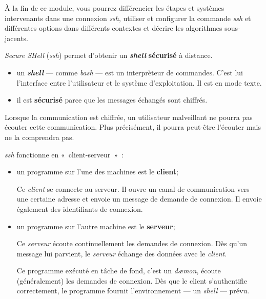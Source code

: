 \documentclass[a4paper,11pt]{article}
\date{2018 -- 2019}
\begin{document}
\entete
\titre
{}
\lastedit

\dosecttoc
\setcounter{tocdepth}{1} 


\begin{tcolorbox}
	[blanker, before skip=10mm,after skip=10mm, 
		borderline west={1mm}{-4mm}{lightgray},
		title=Objectifs, coltitle=black, fonttitle=\sffamily\bfseries\large]

		À la fin de ce module, vous pourrez différencier les étapes et systèmes
		intervenants dans une connexion \textit{ssh}, utiliser et configurer la
		commande \textit{ssh} et différentes options dans différents contextes et
		décrire les algorithmes sous-jacents. 

\end{tcolorbox}

\vspace{-12mm}
\renewcommand{\contentsname}{}
\tableofcontents
\vspace{5mm}

\emph{Secure SHell} (\emph{ssh}) permet d'obtenir un \textbf{\emph{shell}}
\textbf{sécurisé} à distance.

\begin{itemize}

	\item un \textbf{\emph{shell}} --- comme \emph{bash} --- est un interprèteur
		de commandes. C'est lui l'interface entre l'utilisateur et le système
		d'exploitation. Il est en mode texte.

	\item il est \textbf{sécurisé} parce que les messages échangés sont
		chiffrés.  \end{itemize}

Lorsque la communication est chiffrée, un utilisateur malveillant ne
pourra pas écouter cette communication. Plus précisément, il pourra
peut-être l'écouter mais ne la comprendra pas.

\emph{ssh} fonctionne en «~client-serveur~»~:

\begin{itemize}

	\item un programme sur l'une des machines est le \textbf{client};

		Ce \emph{client} se connecte au serveur. Il ouvre un canal de
		communication vers une certaine adresse et envoie un message de demande
		de connexion. Il envoie également des identifiants de connexion.  

	\item un programme sur l'autre machine est le \textbf{serveur};

		Ce \emph{serveur} écoute continuellement les demandes de connexion.  Dès
		qu'un message lui parvient, le \emph{serveur} échange des données avec
		le \emph{client}.

		Ce programme exécuté en tâche de fond, c'est un \emph{dæmon}, écoute
		(généralement) les demandes de connexion. Dès que le client
		s'authentifie correctement, le programme fournit l'environnement --- un
		\emph{shell} --- prévu.

\end{itemize}
\end{document}
